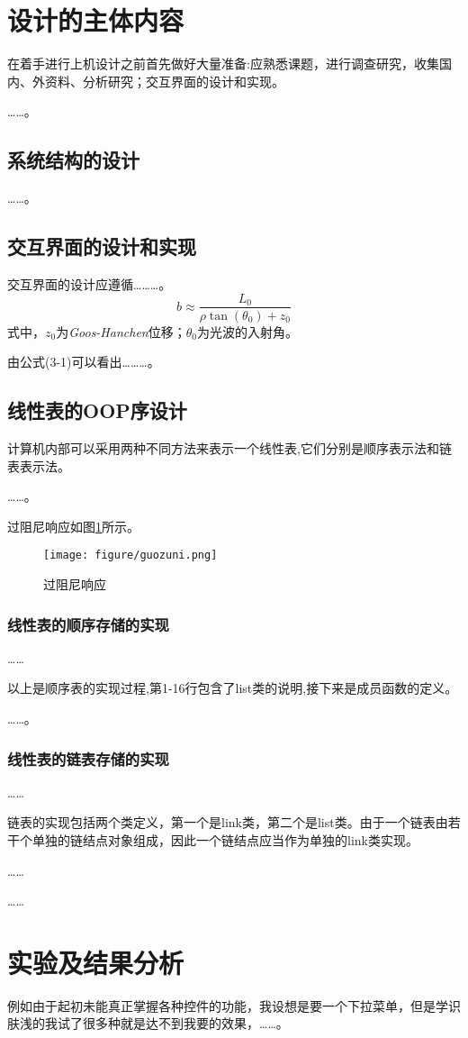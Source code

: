 \documentclass[supercite]{upcthesis}
\begin{document}
\section{设计的主体内容}
在着手进行上机设计之前首先做好大量准备:应熟悉课题，进行调查研究，收集国内、外资料、分析研究；交互界面的设计和实现。

……。
\subsection{系统结构的设计}
……。
\subsection{交互界面的设计和实现}
交互界面的设计应遵循………。
\begin{equation}
        b\approx\frac{L_0}{\rho\tan(\theta_0)+z_0}
\end{equation}
式中，$z_0$为\textit{Goos-Hanchen}位移；$\theta_0$为光波的入射角。

由公式(3-1)可以看出………。
\subsection{线性表的OOP序设计}
计算机内部可以采用两种不同方法来表示一个线性表,它们分别是顺序表示法和链表表示法。

……。

过阻尼响应如图\ref{guozuni}所示。
\begin{figure}[htbp]
\centering

\texttt{[image: figure/guozuni.png]}
\caption{过阻尼响应}
\label{guozuni}
\end{figure}
\subsubsection{线性表的顺序存储的实现}
……

以上是顺序表的实现过程,第1-16行包含了list类的说明,接下来是成员函数的定义。

……。
\subsubsection{线性表的链表存储的实现}
……

链表的实现包括两个类定义，第一个是link类，第二个是list类。由于一个链表由若干个单独的链结点对象组成，因此一个链结点应当作为单独的link类实现。

……

……

\section{实验及结果分析}
例如由于起初未能真正掌握各种控件的功能，我设想是要一个下拉菜单，但是学识肤浅的我试了很多种就是达不到我要的效果，……。
\end{document}
